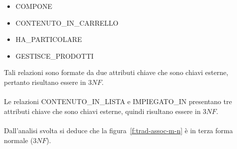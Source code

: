 \begin{itemize}
	
	\item
	COMPONE
	
	\item
	CONTENUTO\_IN\_CARRELLO
	
	\item
	HA\_PARTICOLARE
	
	\item
	GESTISCE\_PRODOTTI
	
\end{itemize}
Tali relazioni sono formate da due attributi chiave che sono chiavi esterne, pertanto risultano essere in $3NF$. \\
\\
Le relazioni CONTENUTO\_IN\_LISTA e IMPIEGATO\_IN presentano tre attributi chiave che sono chiavi esterne, quindi risultano essere in $3NF$.\\
\\
Dall'analisi svolta si deduce che la figura~\vref{f:trad-assoc-m-n} è in terza forma normale ($3NF$).
